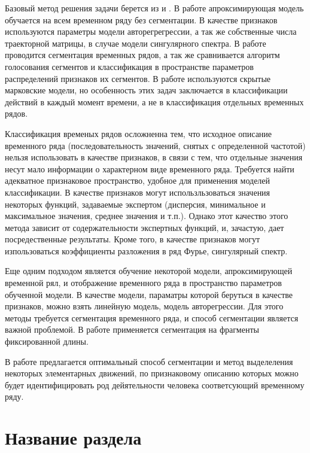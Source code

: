 \documentclass[12pt, twoside]{article}
\begin{document}
Базовый метод решения задачи берется из \cite{Ivkin15} и \cite{Karasikov16}. В работе \cite{Ivkin15} апроксимирующая модель обучается на всем временном ряду без сегментации. В качестве признаков используются параметры модели авторегрегрессии, а так же собственные числа траекторной матрицы, в случае модели сингулярного спектра. В работе \cite{Karasikov16} проводится сегментация временных рядов, а так же сравнивается алгоритм голосования сегментов и классификация в пространстве параметров распределений признаков их сегментов. В работе \cite{Dafne19} используются скрытые марковские модели, но особенность этих задач заключается в классификации действий в каждый момент времени, а не в классификация отдельных временных рядов.

Классификация временых рядов осложненна тем, что исходное описание временного ряда (последовательность значений, снятых с определенной частотой) нельзя использовать в качестве признаков, в связи с тем, что отдельные значения несут мало информации о характерном виде временного ряда. Требуется найти адекватное признаковое пространство, удобное для применения моделей классификации. В качестве признаков могут использльзоваться значения некоторых функций, задаваемые экспертом (дисперсия, минимальное и максимальное значения, среднее значения и т.п.). Однако этот качество этого метода зависит от содержательности экспертных функций, и, зачастую, дает посредественные результаты. Кроме того, в качестве признаков могут изпользоваться коэффициенты разложения в ряд Фурье, сингулярный спектр. 

Еще одним подходом является обучение некоторой модели, апроксимирующей временной рял, и отображение временного ряда в пространство параметров обученной модели. В качестве модели, параматры которой беруться в качестве признаков, можно взять линейную модель, модель авторегрессии. Для этого методы требуется сегментация временного ряда, и способ сегментации является важной проблемой. В работе \cite{Karasikov16} применяется сегментация на фрагменты фиксированной длины.

В работе предлагается оптимальный способ сегментации и метод выделеления некоторых элементарных движений, по признаковому описанию которых можно будет идентифицировать род дейятельности человека соответсующий временному ряду.

\section{Название раздела}
\end{document}
